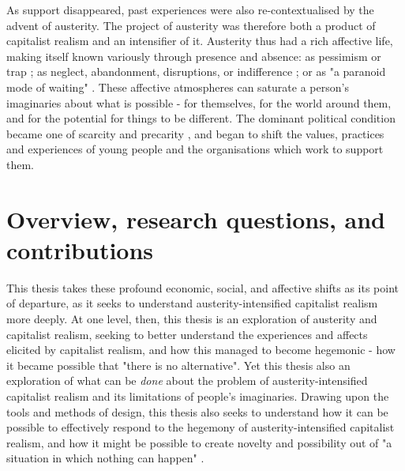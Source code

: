 As support disappeared, past experiences were also re-contextualised by the advent of austerity. The project of austerity was therefore both a product of capitalist realism and an intensifier of it. Austerity thus had a rich affective life, making itself known variously through presence and absence: as pessimism or trap \citep{coleman_austerity_2016}; as neglect, abandonment, disruptions, or indifference  \citep{raynor_dramatising_2017}; or as "a paranoid mode of waiting" \citep[p. 13]{hitchen_affective_2019}. These affective atmospheres can saturate a person's imaginaries about what is possible - for themselves, for the world around them, and for the potential for things to be different. The dominant political condition became one of scarcity and precarity \citep{berlant_cruel_2011}, and began to shift the values, practices and experiences of young people and the organisations which work to support them. 

\section{Overview, research questions, and contributions}
This thesis takes these profound economic, social, and affective shifts as its point of departure, as it seeks to understand austerity-intensified capitalist realism more deeply. At one level, then, this thesis is an exploration of austerity and capitalist realism, seeking to better understand the experiences and affects elicited by capitalist realism, and how this managed to become hegemonic - how it became possible that "there is no alternative". Yet this thesis also an exploration of what can be \textit{done} about the problem of austerity-intensified capitalist realism and its limitations of people's imaginaries. Drawing upon the tools and methods of design, this thesis also seeks to understand how it can be possible to effectively respond to the hegemony of austerity-intensified capitalist realism, and how it might be possible to create novelty and possibility out of "a situation in which nothing can happen" \citep[p. 81]{fisher_capitalist_2009}.

